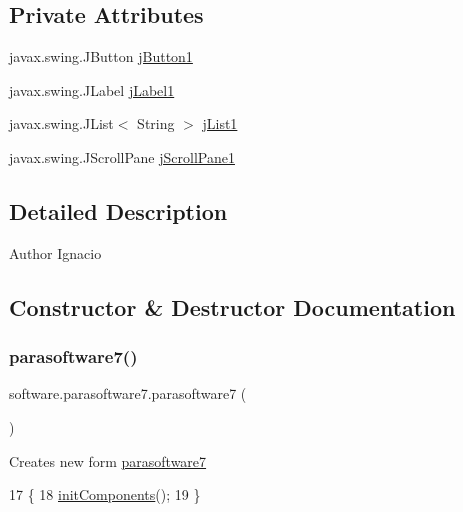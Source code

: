\subsection*{Private Attributes}
\begin{DoxyCompactItemize}
\item 
javax.\+swing.\+J\+Button \mbox{\hyperlink{classsoftware_1_1parasoftware7_ad1649be57f87718bce210a36a2b5a8c3}{j\+Button1}}
\item 
javax.\+swing.\+J\+Label \mbox{\hyperlink{classsoftware_1_1parasoftware7_acf4de3dce9e1861b004011df14fb9d06}{j\+Label1}}
\item 
javax.\+swing.\+J\+List$<$ String $>$ \mbox{\hyperlink{classsoftware_1_1parasoftware7_adb21c8ddcb260404d3b07d8af04c655e}{j\+List1}}
\item 
javax.\+swing.\+J\+Scroll\+Pane \mbox{\hyperlink{classsoftware_1_1parasoftware7_a7579f4ce7f3b0e82e4aa3ea603dc6307}{j\+Scroll\+Pane1}}
\end{DoxyCompactItemize}


\subsection{Detailed Description}
\begin{DoxyAuthor}{Author}
Ignacio 
\end{DoxyAuthor}


\subsection{Constructor \& Destructor Documentation}
\mbox{\label{classsoftware_1_1parasoftware7_a6c9418145b285cdcee5407d2f413c85b}} 
\subsubsection{\texorpdfstring{parasoftware7()}{parasoftware7()}}
{\footnotesize\ttfamily software.\+parasoftware7.\+parasoftware7 (\begin{DoxyParamCaption}{ }\end{DoxyParamCaption})\hspace{0.3cm}{\ttfamily [inline]}}

Creates new form \mbox{\hyperlink{classsoftware_1_1parasoftware7}{parasoftware7}} 
\begin{DoxyCode}
17                            \{
18         \mbox{\hyperlink{classsoftware_1_1parasoftware7_a7c4f26cc8b46641d35e8e30c4555c5fd}{initComponents}}();
19     \}
\end{DoxyCode}


